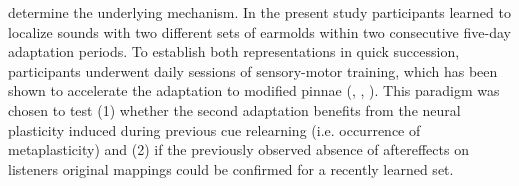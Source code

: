 determine the underlying mechanism. In the present study participants learned to localize sounds with two different sets of earmolds within two consecutive five-day adaptation periods. To establish both representations in quick succession, participants underwent daily sessions of sensory-motor training, which has been shown to accelerate the adaptation to modified pinnae (\citet{carlile_relearning_2014}, \citet{parseihian_rapid_2012}, \citet{trapeau_fast_2016}). This paradigm was chosen to test (1) whether the second adaptation benefits from the neural plasticity induced during previous cue relearning (i.e. occurrence of metaplasticity) and (2) if the previously observed absence of aftereffects on listeners original mappings could be confirmed for a recently learned set.